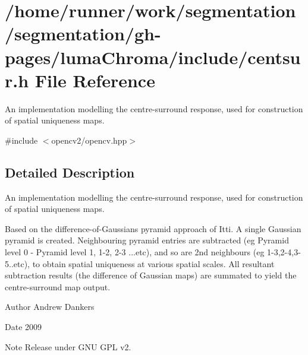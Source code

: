 \section{/home/runner/work/segmentation/segmentation/gh-\/pages/luma\+Chroma/include/centsur.h File Reference}
\label{centsur_8h}


An implementation modelling the centre-\/surround response, used for construction of spatial uniqueness maps.  


{\ttfamily \#include $<$opencv2/opencv.\+hpp$>$}\newline


\subsection{Detailed Description}
An implementation modelling the centre-\/surround response, used for construction of spatial uniqueness maps. 

Based on the difference-\/of-\/\+Gaussians pyramid approach of Itti. A single Gaussian pyramid is created. Neighbouring pyramid entries are subtracted (eg Pyramid level 0 -\/ Pyramid level 1, 1-\/2, 2-\/3 ...etc), and so are 2nd neighbours (eg 1-\/3,2-\/4,3-\/5..etc), to obtain spatial uniqueness at various spatial scales. All resultant subtraction results (the difference of Gaussian maps) are summated to yield the centre-\/surround map output.

\begin{DoxyAuthor}{Author}
Andrew Dankers 
\end{DoxyAuthor}
\begin{DoxyDate}{Date}
2009 
\end{DoxyDate}
\begin{DoxyNote}{Note}
Release under G\+NU G\+PL v2. 
\end{DoxyNote}
